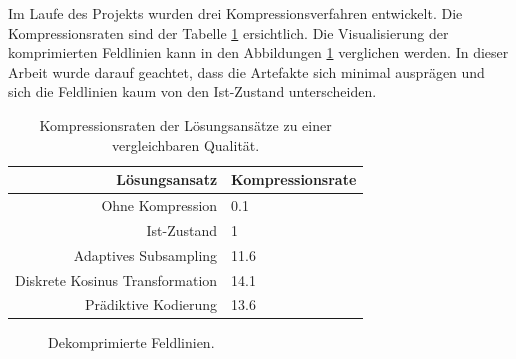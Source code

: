 Im Laufe des Projekts wurden drei Kompressionsverfahren entwickelt. Die Kompressionsraten sind der Tabelle \ref{einleitung:tabelle} ersichtlich. Die Visualisierung der komprimierten Feldlinien kann in den Abbildungen \ref{einleitung:artefakte} verglichen werden. In dieser Arbeit wurde darauf geachtet, dass die Artefakte sich minimal ausprägen und sich die Feldlinien kaum von den Ist-Zustand unterscheiden.
\begin{table}[!htbp]
	\center
	\begin{tabular}{r|l}
		Lösungsansatz & Kompressionsrate \\\hline
		Ohne Kompression & 0.1\\
		Ist-Zustand & 1\\
		Adaptives Subsampling & 11.6 \\
		Diskrete Kosinus Transformation & 14.1 \\
		Prädiktive Kodierung & 13.6\\
	\end{tabular}
	\caption{Kompressionsraten der Lösungsansätze zu einer vergleichbaren Qualität.}
	\label{einleitung:tabelle}
\end{table}
\begin{figure}[!htbp]
\center
{}
\caption{Dekomprimierte Feldlinien.}
\label{einleitung:artefakte}
\end{figure}
